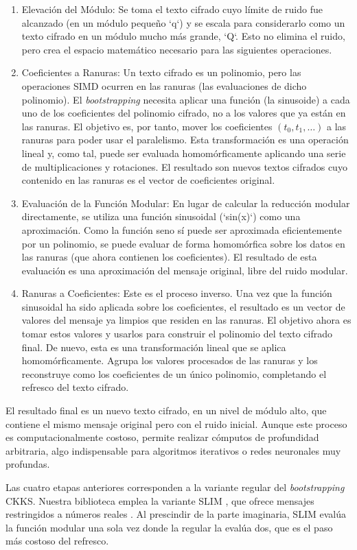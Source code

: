 \begin{enumerate}
    \item Elevación del Módulo: Se toma el texto cifrado cuyo límite de ruido fue alcanzado (en un módulo pequeño `q`) y se escala para considerarlo como un texto cifrado en un módulo mucho más grande, `Q`. Esto no elimina el ruido, pero crea el espacio matemático necesario para las siguientes operaciones.

    \item Coeficientes a Ranuras: Un texto cifrado es un polinomio, pero las operaciones SIMD ocurren en las ranuras (las evaluaciones de dicho polinomio). El \textit{bootstrapping} necesita aplicar una función (la sinusoide) a cada uno de los coeficientes del polinomio cifrado, no a los valores que ya están en las ranuras. El objetivo es, por tanto, mover los coeficientes $(t_0, t_1, \dots)$ a las ranuras para poder usar el paralelismo. Esta transformación es una operación lineal y, como tal, puede ser evaluada homomórficamente aplicando una serie de multiplicaciones y rotaciones. El resultado son nuevos textos cifrados cuyo contenido en las ranuras es el vector de coeficientes original.

    \item Evaluación de la Función Modular: En lugar de calcular la reducción modular directamente, se utiliza una función sinusoidal (`sin(x)`) como una aproximación. Como la función seno sí puede ser aproximada eficientemente por un polinomio, se puede evaluar de forma homomórfica sobre los datos en las ranuras (que ahora contienen los coeficientes). El resultado de esta evaluación es una aproximación del mensaje original, libre del ruido modular.

    \item Ranuras a Coeficientes: Este es el proceso inverso. Una vez que la función sinusoidal ha sido aplicada sobre los coeficientes, el resultado es un vector de valores del mensaje ya limpios que residen en las ranuras. El objetivo ahora es tomar estos valores y usarlos para construir el polinomio del texto cifrado final. De nuevo, esta es una transformación lineal que se aplica homomórficamente. Agrupa los valores procesados de las ranuras y los reconstruye como los coeficientes de un único polinomio, completando el refresco del texto cifrado.
\end{enumerate}

El resultado final es un nuevo texto cifrado, en un nivel de módulo alto, que contiene el mismo mensaje original pero con el ruido inicial. Aunque este proceso es computacionalmente costoso, permite realizar cómputos de profundidad arbitraria, algo indispensable para algoritmos iterativos o redes neuronales muy profundas.

Las cuatro etapas anteriores corresponden a la variante regular del \textit{bootstrapping} CKKS. Nuestra biblioteca emplea la variante SLIM \cite{ChenHan18}, que ofrece mensajes restringidos a números reales \cite{HEonGPU}. Al prescindir de la parte imaginaria, SLIM evalúa la función modular una sola vez donde la regular la evalúa dos, que es el paso más costoso del refresco.

